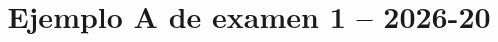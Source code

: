 \documentclass{exam}
\title{Ejemplo A de examen 1 -- 2026-20}
\begin{document}
\makeexamheader


\newpage
\programmingGrid
\newpage

\newpage

\programmingGrid
\end{document}
